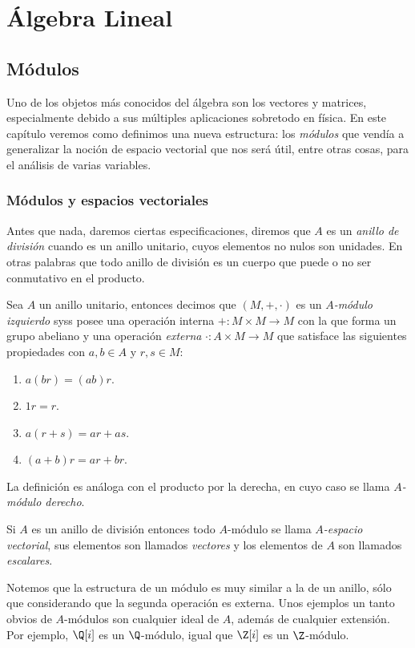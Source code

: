 \documentclass[11pt,oneside]{book}
\begin{document}
\part{Álgebra Lineal}
\chapter{Módulos}
Uno de los objetos más conocidos del álgebra son los vectores y matrices, especialmente debido a sus múltiples aplicaciones sobretodo en física. En este capítulo veremos como definimos una nueva estructura: los \textit{módulos} que vendía a generalizar la noción de espacio vectorial que nos será útil, entre otras cosas, para el análisis de varias variables.

\section{Módulos y espacios vectoriales}
Antes que nada, daremos ciertas especificaciones, diremos que $A$ es un \textit{anillo de división} cuando es un anillo unitario, cuyos elementos no nulos son unidades. En otras palabras que todo anillo de división es un cuerpo que puede o no ser conmutativo en el producto.
\begin{mydef}[$A$-módulo]
Sea $A$ un anillo unitario, entonces decimos que $(M,+,\cdot)$ es un \textit{$A$-módulo izquierdo} syss posee una operación interna $+:M\times M\rightarrow M$ con la que forma un grupo abeliano y una operación \textit{externa} $\cdot:A\times M\rightarrow M$ que satisface las siguientes propiedades con $a,b\in A$ y $r,s\in M$:
\begin{enumerate}
	\item $a(br)=(ab)r$.
	\item $1r=r$.
	\item $a(r+s)=ar+as$.
	\item $(a+b)r=ar+br$.
\end{enumerate}
La definición es análoga con el producto por la derecha, en cuyo caso se llama \textit{$A$-módulo derecho}.

Si $A$ es un anillo de división entonces todo $A$-módulo se llama \textit{$A$-espacio vectorial}, sus elementos son llamados \textit{vectores} y los elementos de $A$ son llamados \textit{escalares}.
\end{mydef}
Notemos que la estructura de un módulo es muy similar a la de un anillo, sólo que considerando que la segunda operación es externa. Unos ejemplos un tanto obvios de $A$-módulos son cualquier ideal de $A$, además de cualquier extensión. Por ejemplo, $\Q[i]$ es un $\Q$-módulo, igual que $\Z[i]$ es un $\Z$-módulo.
\end{document}
